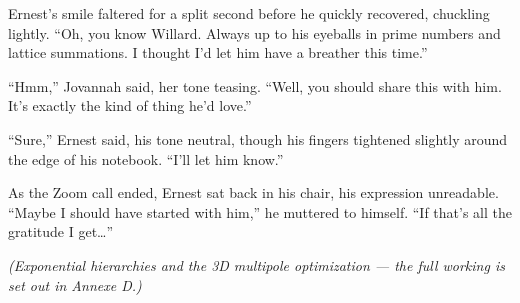 Ernest’s smile faltered for a split second before he quickly recovered, chuckling lightly. “Oh, you know Willard. Always up to his eyeballs in prime numbers and lattice summations. I thought I’d let him have a breather this time.”

“Hmm,” Jovannah said, her tone teasing. “Well, you should share this with him. It’s exactly the kind of thing he’d love.”

“Sure,” Ernest said, his tone neutral, though his fingers tightened slightly around the edge of his notebook. “I’ll let him know.”

As the Zoom call ended, Ernest sat back in his chair, his expression unreadable. “Maybe I should have started with him,” he muttered to himself. “If that’s all the gratitude I get…”

\textit{(Exponential hierarchies and the 3D multipole optimization --- the full working is set out in Annexe D.)}

